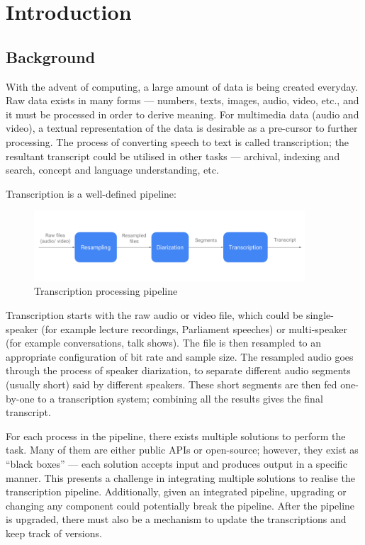 \chapter{Introduction}

\section{Background}

With the advent of computing, a large amount of data is being created everyday.
Raw data exists in many forms --- numbers, texts, images, audio, video, etc.,
and it must be processed in order to derive meaning. For multimedia data (audio
and video), a textual representation of the data is desirable as a pre-cursor
to further processing. The process of converting speech to text is called
transcription; the resultant transcript could be utilised in other tasks ---
archival, indexing and search, concept and language understanding, etc.

Transcription is a well-defined pipeline:

\begin{figure}[h]
\begin{center}
    \includegraphics[width=0.9\textwidth]{images/pipeline.png}
    \caption{Transcription processing pipeline}
\end{center}
\end{figure}

Transcription starts with the raw audio or video file, which could be
single-speaker (for example lecture recordings, Parliament speeches) or
multi-speaker (for example conversations, talk shows). The file is then resampled
to an appropriate configuration of bit rate and sample size. The resampled audio
goes through the process of speaker diarization, to separate different audio
segments (usually short) said by different speakers. These short segments are
then fed one-by-one to a transcription system; combining all the results gives
the final transcript.

For each process in the pipeline, there exists multiple solutions to perform
the task. Many of them are either public APIs or open-source; however, they exist
as ``black boxes'' --- each solution accepts input and produces output in a
specific manner. This presents a challenge in integrating multiple solutions to
realise the transcription pipeline. Additionally, given an integrated pipeline,
upgrading or changing any component could potentially break the pipeline. After
the pipeline is upgraded, there must also be a mechanism to update the
transcriptions and keep track of versions. 

